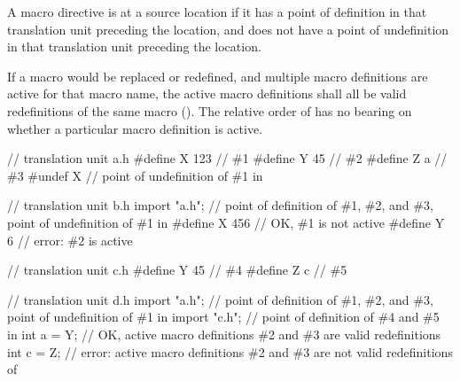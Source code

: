 \begin{std.txt}
\pnum
A macro directive is  at a source location
if it has a point of definition in that translation unit preceding the location,
and does not have a point of undefinition in that translation unit preceding
the location.

\pnum
If a macro would be replaced or redefined, and multiple macro definitions
are active for that macro name, the active macro definitions shall all be
valid redefinitions of the same macro ().
\enternote
The relative order of  has no bearing on whether a
particular macro definition is active.
\exitnote

\pnum
\begin{example}
\begin{codeblock}
// translation unit a.h
#define X 123 // \#1
#define Y 45  // \#2
#define Z a   // \#3
#undef X      // point of undefinition of \#1 in 
\end{codeblock}

\begin{codeblock}
// translation unit b.h
import "a.h"; // point of definition of \#1, \#2, and \#3, point of undefinition of \#1 in 
#define X 456 // OK, \#1 is not active
#define Y 6   // error: \#2 is active
\end{codeblock}

\begin{codeblock}
// translation unit c.h
#define Y 45  // \#4
#define Z c   // \#5
\end{codeblock}

\begin{codeblock}
// translation unit d.h
import "a.h"; // point of definition of \#1, \#2, and \#3, point of undefinition of \#1 in 
import "c.h"; // point of definition of \#4 and \#5 in 
int a = Y;    // OK, active macro definitions \#2 and \#3 are valid redefinitions
int c = Z;    // error: active macro definitions \#2 and \#3 are not valid redefinitions of 
\end{codeblock}
\end{example}
\end{std.txt}
